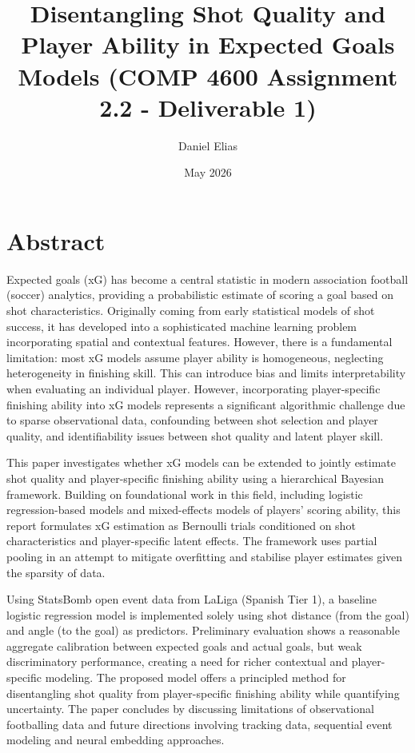 \documentclass{article}
\title{Disentangling Shot Quality and Player Ability in Expected Goals Models (COMP 4600 Assignment 2.2 - Deliverable 1)}
\author{Daniel Elias}
\date{May 2026}
\begin{document}
\maketitle

\section{Abstract}
Expected goals (xG) has become a central statistic in modern association football (soccer) analytics, providing a probabilistic estimate of scoring a goal based on shot characteristics. Originally coming from early statistical models of shot success, it has developed into a sophisticated machine learning problem incorporating spatial and contextual features. However, there is a fundamental limitation: most xG models assume player ability is homogeneous, neglecting heterogeneity in finishing skill. This can introduce bias and limits interpretability when evaluating an individual player. However, incorporating player-specific finishing ability into xG models represents a significant algorithmic challenge due to sparse observational data, confounding between shot selection and player quality, and identifiability issues between shot quality and latent player skill.

This paper investigates whether xG models can be extended to jointly estimate shot quality and player-specific finishing ability using a hierarchical Bayesian framework. Building on foundational work in this field, including logistic regression-based models and mixed-effects models of players' scoring ability, this report formulates xG estimation as Bernoulli trials conditioned on shot characteristics and player-specific latent effects. The framework uses partial pooling in an attempt to mitigate overfitting and stabilise player estimates given the sparsity of data.

Using StatsBomb open event data from LaLiga (Spanish Tier 1), a baseline logistic regression model is implemented solely using shot distance (from the goal) and angle (to the goal) as predictors. Preliminary evaluation shows a reasonable aggregate calibration between expected goals and actual goals, but weak discriminatory performance, creating a need for richer contextual and player-specific modeling. The proposed model offers a principled method for disentangling shot quality from player-specific finishing ability while quantifying uncertainty. The paper concludes by discussing limitations of observational footballing data and future directions involving tracking data, sequential event modeling and neural embedding approaches.
\end{document}
